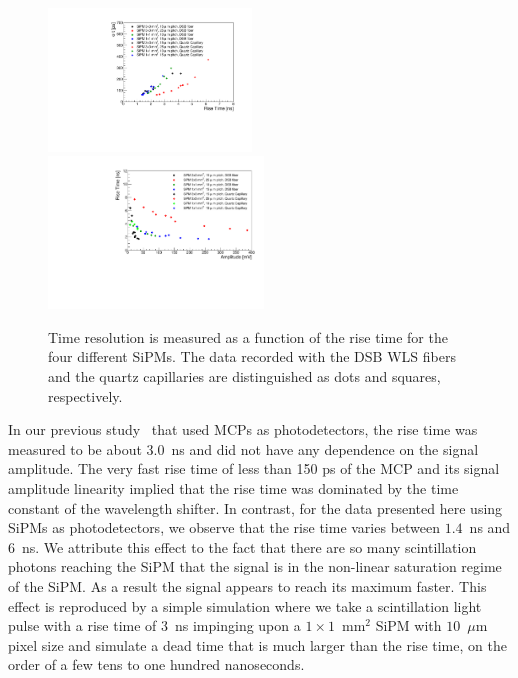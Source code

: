 \begin{figure}[!htb]
\centering
\includegraphics[width=0.48\textwidth]{figures/ShashlikTimeResolutionVsRiseTime.pdf}
\includegraphics[width=0.51\textwidth]{figures/ShashlikRiseTimeVsAmplitude.pdf}
\caption{\label{RiseTime}Time resolution is measured as a function of the rise time
for the four different SiPMs. The data recorded with the DSB WLS fibers and the
quartz capillaries are distinguished as dots and squares, respectively. }
\end{figure}

In our previous study~\cite{Anderson:2015gha} that used MCPs as photodetectors,
the rise time was measured to be about $3.0$~ns and did not have any dependence
on the signal amplitude. The very fast rise time of less than 150 ps of the MCP
and its signal amplitude linearity implied that the rise time was dominated by
the time constant of the wavelength shifter. In contrast, for the data presented
here using SiPMs as photodetectors, we observe that the rise time varies between
$1.4$~ns and $6$~ns. We attribute this effect to the fact that
there are so many scintillation photons reaching the SiPM that the signal is in
the non-linear saturation regime of the SiPM. As a result the signal appears to reach
its maximum faster. This effect is reproduced by a simple simulation where we 
take a scintillation light pulse with a rise time of $3$~ns impinging upon a
$1\times1$~$\mathrm{mm}^{2}$ SiPM with $10$~$\mu$m pixel size and 
simulate a dead time that is much larger than the rise time, on the order of
a few tens to one hundred nanoseconds.

